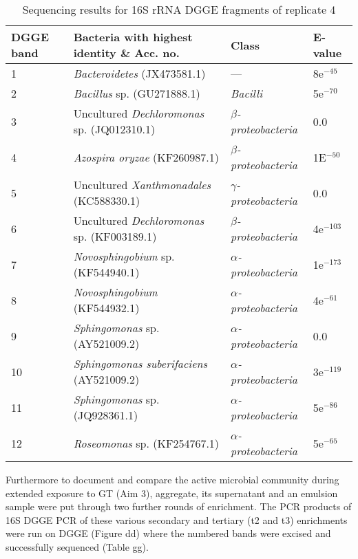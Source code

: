 \documentclass[11pt]{article}
\begin{document}
\begin{table}
\caption{Sequencing results for 16S rRNA DGGE fragments of replicate 4}
\begin{tabular}{ | l | p{7.8cm} | p{3cm} | l | }
\hline
DGGE band & Bacteria with highest identity \& Acc. no. & Class & E-value \\
\hline
1   &  \emph{Bacteroidetes} (JX473581.1) & --- & 8e$^{-45}$ \\
\hline
2  & \emph{Bacillus} sp. (GU271888.1) & \emph{Bacilli} & 5e$^{-70}$ \\
\hline
3 & Uncultured \emph{Dechloromonas} sp. (JQ012310.1) & \emph{$\beta$-proteobacteria} & 0.0 \\
\hline
4 & \emph{Azospira oryzae} (KF260987.1) & \emph{$\beta$-proteobacteria} & 1E$^{-50}$ \\
\hline
5 & Uncultured \emph{Xanthmonadales} (KC588330.1) & \emph{$\gamma$-proteobacteria} & 0.0 \\
\hline
6 & Uncultured \emph{Dechloromonas} sp. (KF003189.1) & \emph{$\beta$-proteobacteria} & 4e$^{-103}$ \\
\hline
7 & \emph{Novosphingobium} sp. (KF544940.1) & \emph{$\alpha$-proteobacteria} & 1e$^{-173}$ \\
\hline
8 & \emph{Novosphingobium} (KF544932.1) & \emph{$\alpha$-proteobacteria} & 4e$^{-61}$ \\
\hline
9 & \emph{Sphingomonas} sp. (AY521009.2) & \emph{$\alpha$-proteobacteria} & 0.0 \\
\hline
10 & \emph{Sphingomonas suberifaciens} (AY521009.2) & \emph{$\alpha$-proteobacteria} & 3e$^{-119}$ \\
\hline
11 & \emph{Sphingomonas} sp. (JQ928361.1) & \emph{$\alpha$-proteobacteria} & 5e$^{-86}$ \\
\hline
12 & \emph{Roseomonas} sp.  (KF254767.1) & \emph{$\alpha$-proteobacteria} & 5e$^{-65}$ \\
\hline
\end{tabular}

\end{table}
\FloatBarrier

Furthermore to document and compare the active microbial community during extended exposure to GT (Aim 3), aggregate, its supernatant and an emulsion sample were put through two further rounds of enrichment. The PCR products of 16S DGGE PCR of these various secondary and tertiary (t2 and t3) enrichments were run on DGGE (Figure dd) where the numbered bands were excised and successfully sequenced (Table gg). 
\end{document}

